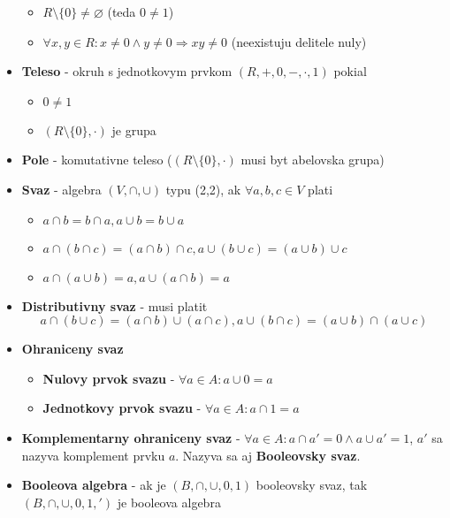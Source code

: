 \documentclass[12pt]{article}
\begin{document}
\begin{itemize}
		\begin{itemize}
			\item $R \setminus \{0\} \not= \varnothing$ (teda $0 \not= 1$)
			\item $\forall x,y \in R: x \not= 0 \land y \not= 0 \Rightarrow xy \not= 0$ (neexistuju delitele nuly)
		\end{itemize}
	\item \textbf{Teleso} - okruh s jednotkovym prvkom $(R,+,0,-,\cdot,1)$ pokial
		\begin{itemize}
			\item $0 \not= 1$
			\item $(R \setminus \{0\}, \cdot)$ je grupa
		\end{itemize}
	\item \textbf{Pole} - komutativne teleso ($(R \setminus \{0\}, \cdot)$ musi byt abelovska grupa)
	\item \textbf{Svaz} - algebra $(V,\cap,\cup)$ typu (2,2), ak $\forall a,b,c \in V$ plati
		\begin{itemize}
			\item $a \cap b = b \cap a, a \cup b = b \cup a$
			\item $a \cap (b \cap c) = (a \cap b) \cap c, a \cup (b \cup c) = (a \cup b) \cup c$
			\item $a \cap (a \cup b) = a, a \cup (a \cap b) = a$
		\end{itemize}
	\item \textbf{Distributivny svaz} - musi platit
		\begin{equation*}
			a \cap (b \cup c) = (a \cap b) \cup (a \cap c), a \cup (b \cap c) = (a \cup b) \cap (a \cup c)
		\end{equation*}
	\item \textbf{Ohraniceny svaz}
		\begin{itemize}
			\item \textbf{Nulovy prvok svazu} - $\forall a \in A: a \cup 0 = a$
			\item \textbf{Jednotkovy prvok svazu} - $\forall a \in A: a \cap 1 = a$
		\end{itemize}
	\item \textbf{Komplementarny ohraniceny svaz} - $\forall a \in A: a \cap a' = 0 \land a \cup a' = 1$,
		$a'$ sa nazyva komplement prvku $a$. Nazyva sa aj \textbf{Booleovsky svaz}.
	\item \textbf{Booleova algebra} - ak je $(B,\cap,\cup,0,1)$ booleovsky svaz, tak $(B,\cap,\cup,0,1,')$ je booleova
		algebra
\end{itemize}
\end{document}
